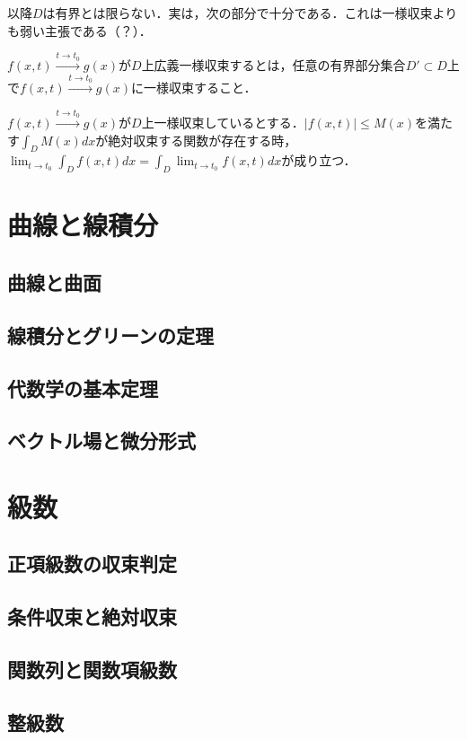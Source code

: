 \documentclass[uplatex, dvipdfmx]{jsreport}
\begin{document}
以降$D$は有界とは限らない．実は，次の部分で十分である．これは一様収束よりも弱い主張である（？）．
\begin{definition}
    $f(x,t)\xrightarrow{t\to t_0}g(x)$が$D$上広義一様収束するとは，任意の有界部分集合$D'\subset D$上で$f(x,t)\xrightarrow{t\to t_0}g(x)$に一様収束すること．
\end{definition}

\begin{proposition}
    $f(x,t)\xrightarrow{t\to t_0}g(x)$が$D$上一様収束しているとする．$|f(x,t)|\le M(x)$を満たす$\int_DM(x)dx$が絶対収束する関数が存在する時，$\lim_{t\to t_0}\int_Df(x,t)dx=\int_D\lim_{t\to t_0}f(x,t)dx$が成り立つ．
\end{proposition}

\chapter{曲線と線積分}

\section{曲線と曲面}

\section{線積分とグリーンの定理}

\section{代数学の基本定理}

\section{ベクトル場と微分形式}

\chapter{級数}

\section{正項級数の収束判定}

\section{条件収束と絶対収束}

\section{関数列と関数項級数}

\section{整級数}
\end{document}
